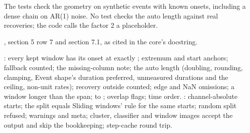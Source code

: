 The tests check the geometry on synthetic events with known onsets, including a dense chain on
AR(1) noise. No test checks the auto length against real recoveries; the code calls the factor 2
a placeholder.

, section 5 row 7 and section 7.1, as
cited in the core's docstring.

: every kept window has its onset at exactly
; extremum and start anchors; fallback counted; the missing-column note; the
auto length (doubling, rounding, clamping, Event shape's duration preferred, unmeasured durations
and the ceiling, non-unit rates); recovery outside counted; edge and NaN omissions; a window
longer than the span;  to ; overlap flags; time order.
: channel-absolute starts; the split equals Sliding
windows' rule for the same starts; random split refused; warnings and meta; cluster, classifier
and window images accept the output and skip the bookkeeping; step-cache round trip.
